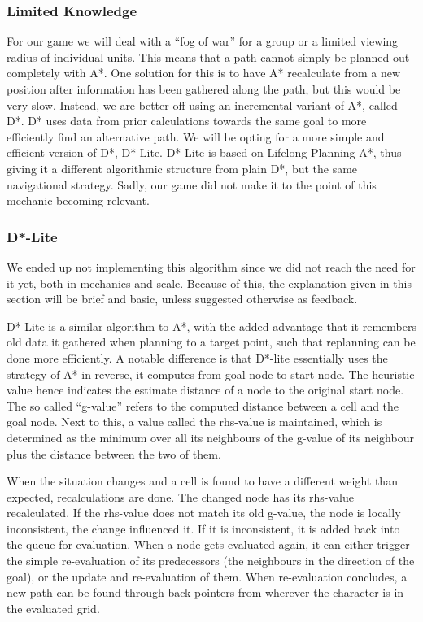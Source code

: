 \subsubsection{Limited Knowledge}
For our game we will deal with a ``fog of war'' for a group or a limited viewing radius of individual units. This means that a path cannot simply be planned out completely with A*. One solution for this is to have A* recalculate from a new position after information has been gathered along the path, but this would be very slow. Instead, we are better off using an incremental variant of A*, called D*. D* uses data from prior calculations towards the same goal to more efficiently find an alternative path. We will be opting for a more simple and efficient version of D*, D*-Lite. D*-Lite is based on Lifelong Planning A*, thus giving it a different algorithmic structure from plain D*, but the same navigational strategy. Sadly, our game did not make it to the point of this mechanic becoming relevant.

\subsubsection{D*-Lite}
We ended up not implementing this algorithm since we did not reach the need for it yet, both in mechanics and scale. Because of this, the explanation given in this section will be brief and basic, unless suggested otherwise as feedback.

D*-Lite is a similar algorithm to A*, with the added advantage that it remembers old data it gathered when planning to a target point, such that replanning can be done more efficiently. A notable difference is that D*-lite essentially uses the strategy of A* in reverse, it computes from goal node to start node. The heuristic value hence indicates the estimate distance of a node to the original start node. The so called ``g-value'' refers to the computed distance between a cell and the goal node. Next to this, a value called the rhs-value is maintained, which is determined as the minimum over all its neighbours of the g-value of its neighbour plus the distance between the two of them.

When the situation changes and a cell is found to have a different weight than expected, recalculations are done. The changed node has its rhs-value recalculated. If the rhs-value does not match its old g-value, the node is locally inconsistent, the change influenced it. If it is inconsistent, it is added back into the queue for evaluation. When a node gets evaluated again, it can either trigger the simple re-evaluation of its predecessors (the neighbours in the direction of the goal), or the update and re-evaluation of them. When re-evaluation concludes, a new path can be found through back-pointers from wherever the character is in the evaluated grid.


